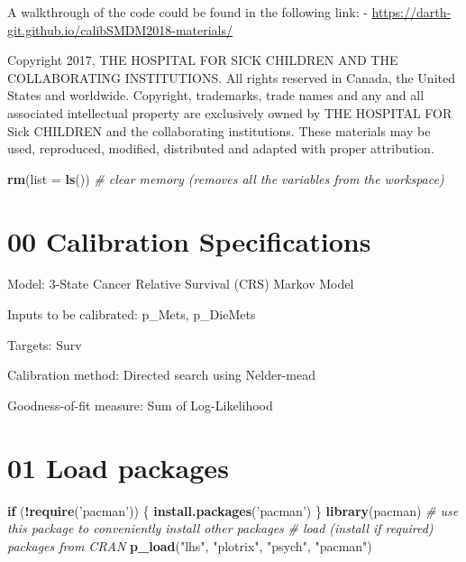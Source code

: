 \documentclass[
]{article}
\newenvironment{Shaded}{\begin{snugshade}}{\end{snugshade}}
\newcommand{\CommentTok}[1]{\textcolor[rgb]{0.56,0.35,0.01}{\textit{#1}}}
\newcommand{\ControlFlowTok}[1]{\textcolor[rgb]{0.13,0.29,0.53}{\textbf{#1}}}
\newcommand{\DataTypeTok}[1]{\textcolor[rgb]{0.13,0.29,0.53}{#1}}
\newcommand{\KeywordTok}[1]{\textcolor[rgb]{0.13,0.29,0.53}{\textbf{#1}}}
\newcommand{\NormalTok}[1]{#1}
\newcommand{\OperatorTok}[1]{\textcolor[rgb]{0.81,0.36,0.00}{\textbf{#1}}}
\newcommand{\StringTok}[1]{\textcolor[rgb]{0.31,0.60,0.02}{#1}}
\begin{document}
A walkthrough of the code could be found in the following link: -
\url{https://darth-git.github.io/calibSMDM2018-materials/}

Copyright 2017, THE HOSPITAL FOR SICK CHILDREN AND THE COLLABORATING
INSTITUTIONS. All rights reserved in Canada, the United States and
worldwide. Copyright, trademarks, trade names and any and all associated
intellectual property are exclusively owned by THE HOSPITAL FOR Sick
CHILDREN and the collaborating institutions. These materials may be
used, reproduced, modified, distributed and adapted with proper
attribution.

\newpage

\begin{Shaded}
\begin{Highlighting}[]
\KeywordTok{rm}\NormalTok{(}\DataTypeTok{list =} \KeywordTok{ls}\NormalTok{())      }\CommentTok{# clear memory (removes all the variables from the workspace)}
\end{Highlighting}
\end{Shaded}

\hypertarget{calibration-specifications}{%
\section{00 Calibration
Specifications}\label{calibration-specifications}}

Model: 3-State Cancer Relative Survival (CRS) Markov Model

Inputs to be calibrated: p\_Mets, p\_DieMets

Targets: Surv

Calibration method: Directed search using Nelder-mead

Goodness-of-fit measure: Sum of Log-Likelihood

\hypertarget{load-packages}{%
\section{01 Load packages}\label{load-packages}}

\begin{Shaded}
\begin{Highlighting}[]
\ControlFlowTok{if}\NormalTok{ (}\OperatorTok{!}\KeywordTok{require}\NormalTok{(}\StringTok{'pacman'}\NormalTok{)) \{}
  \KeywordTok{install.packages}\NormalTok{(}\StringTok{'pacman'}\NormalTok{)}
\NormalTok{\}}
\KeywordTok{library}\NormalTok{(pacman) }\CommentTok{# use this package to conveniently install other packages}
\CommentTok{# load (install if required) packages from CRAN}
\KeywordTok{p_load}\NormalTok{(}\StringTok{"lhs"}\NormalTok{, }\StringTok{"plotrix"}\NormalTok{, }\StringTok{"psych"}\NormalTok{, }\StringTok{"pacman"}\NormalTok{)  }
\end{Highlighting}
\end{Shaded}
\end{document}
